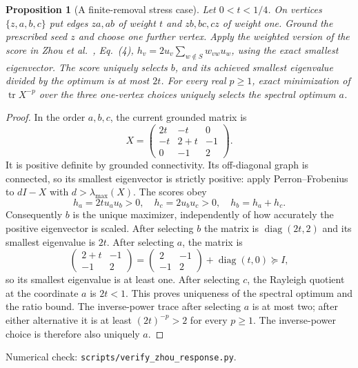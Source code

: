 \documentclass[11pt]{article}
\newtheorem{proposition}[theorem]{Proposition}
\DeclareMathOperator{\tr}{tr}
\DeclareMathOperator{\diag}{diag}
\begin{document}
\begin{proposition}[A finite-removal stress case]\label{prop:zhoustress}
Let $0<t<1/4$. On vertices $\{z,a,b,c\}$ put edges $za,ab$
of weight $t$ and $zb,bc,cz$ of weight one. Ground the prescribed
seed $z$ and choose one further vertex. Apply the weighted version
of the score in Zhou et al.\ \cite{zhou2023}, Eq.~(4),
$h_v=2u_v\sum_{w\notin S}w_{vw}u_w$, using the exact smallest
eigenvector. The score uniquely selects $b$, and its achieved
smallest eigenvalue divided by the optimum is at most $2t$.
For every real $p\geq1$, exact minimization of $\tr X^{-p}$
over the three one-vertex choices uniquely selects the spectral
optimum $a$.
\end{proposition}
\begin{proof}
In the order $a,b,c$, the current grounded matrix is
\[
 X=\begin{pmatrix}2t&-t&0\\-t&2+t&-1\\0&-1&2\end{pmatrix}.
\]
It is positive definite by grounded connectivity. Its off-diagonal
graph is connected, so its smallest eigenvector is strictly positive:
apply Perron--Frobenius to $dI-X$ with $d>\lambda_{\max}(X)$.
The scores obey
\[
 h_a=2tu_au_b>0,\quad h_c=2u_bu_c>0,\quad h_b=h_a+h_c.
\]
Consequently $b$ is the unique maximizer, independently of how
accurately the positive eigenvector is scaled. After selecting $b$
the matrix is $\diag(2t,2)$ and its smallest eigenvalue is $2t$.
After selecting $a$, the matrix is
\[
 \begin{pmatrix}2+t&-1\\-1&2\end{pmatrix}
 =\begin{pmatrix}2&-1\\-1&2\end{pmatrix}
   +\diag(t,0)\succeq I,
\]
so its smallest eigenvalue is at least one. After selecting $c$,
the Rayleigh quotient at the coordinate $a$ is $2t<1$.
This proves uniqueness of the spectral optimum and the ratio bound.
The inverse-power trace after selecting $a$ is at most two; after
either alternative it is at least $(2t)^{-p}>2$ for every $p\geq1$.
The inverse-power choice is therefore also uniquely $a$.
\end{proof}
\noindent Numerical check: \texttt{scripts/verify\_zhou\_response.py}.
\end{document}
